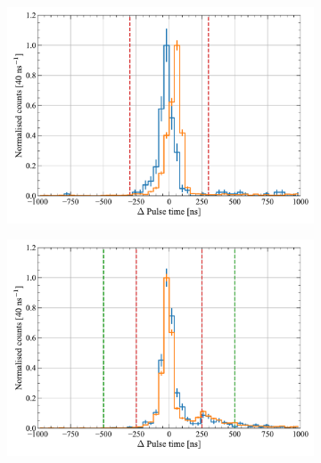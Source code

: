 \begin{figure}[!ht]
	\centering
	\begin{subfigure}[b]{0.49\textwidth}
		\centering
		\includegraphics[width=\textwidth]{figures/VetoEfficiency/ODpromptWindowTiming.pdf}
        \caption{}
		\label{fig:VetoEff/od_prompt_window}
	\end{subfigure}
	\hfill
	\begin{subfigure}[b]{0.49\textwidth}
		\centering
		\includegraphics[width=\textwidth]{figures/VetoEfficiency/SkinpromptWindowTiming.pdf}
		\caption{}
        \label{fig:VetoEff/skin_prompt_window}
	\end{subfigure}

\end{figure}
